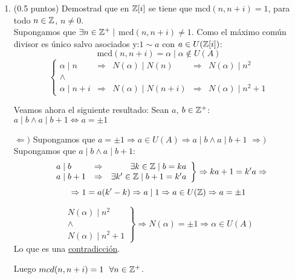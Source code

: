\documentclass[12pt]{article}
\begin{document}
\begin{ejercicio}[4 puntos]
\begin{enumerate}
            \item (0.5 puntos) Demostrad que en $\mathbb{Z}[i]$ se tiene que mcd$(n,n+i) = 1$, para todo $n \in \mathbb{Z}$, $n \neq 0$.\\

                \noindent
                Supongamos que $\exists n \in \mathbb{Z}^{+} \mid$ mcd$(n, n+i) \neq 1$.\newline
                Como el máximo común divisor es único salvo asociados y:\newline $1\sim a$ con $a \in U(\mathbb{Z}[i])$:
                $$\mbox{mcd}(n, n+i) = \alpha \mid \alpha \notin U(A)$$
                $$\left\{ \begin{array}{lclcl}
                    \alpha \mid n & \Rightarrow & N(\alpha) \mid N(n) & \Rightarrow & N(\alpha) \mid n^2 \\
                    \land & & & & \\
                    \alpha \mid n+i & \Rightarrow & N(\alpha) \mid N(n+i) & \Rightarrow & N(\alpha) \mid n^2 +1
                \end{array}\right.$$

                Veamos ahora el siguiente resultado:\newline
                Sean $a$, $b \in \mathbb{Z}^{+}$: $a \mid b \land a\mid b+1 \Leftrightarrow a = \pm 1$

                \noindent
                $\Leftarrow)$ Supongamos que $a = \pm 1 \Rightarrow a \in U(A) \Rightarrow a \mid b \land a \mid b+1$\newline
                $\Rightarrow)$ Supongamos que $a \mid b \land a \mid b + 1$:
                $$\left. \begin{array}{lcr}
                    a \mid b & \Rightarrow & \exists k \in \mathbb{Z} \mid b = ka \\
                    a \mid b +1 & \Rightarrow & \exists k' \in \mathbb{Z} \mid b+1 = k'a
                \end{array}\right\} \Rightarrow ka+1 = k'a \Rightarrow$$
                $$\Rightarrow 1 = a(k'-k) \Rightarrow a \mid 1 \Rightarrow a \in U(\mathbb{Z}) \Rightarrow a = \pm 1$$

                $$\left. \begin{array}{l}
                    N(\alpha) \mid n^2 \\
                    \land \\
                    N(\alpha) \mid n^2 + 1
                \end{array}\right\} \Rightarrow N(\alpha) = \pm 1 \Rightarrow \alpha \in U(A)$$
                Lo que es una \underline{contradicción}.

                \noindent
                Luego $mcd(n, n+i) = 1~~\forall n \in \mathbb{Z}^{+}$.
        \end{enumerate} 
    \end{ejercicio}
    
\end{document}
